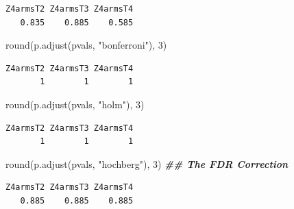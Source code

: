 \documentclass[
  12pt,
]{book}
\newenvironment{Shaded}{\begin{snugshade}}{\end{snugshade}}
\newcommand{\CommentTok}[1]{\textcolor[rgb]{0.56,0.35,0.01}{\textit{#1}}}
\newcommand{\DecValTok}[1]{\textcolor[rgb]{0.00,0.00,0.81}{#1}}
\newcommand{\DocumentationTok}[1]{\textcolor[rgb]{0.56,0.35,0.01}{\textbf{\textit{#1}}}}
\newcommand{\FunctionTok}[1]{\textcolor[rgb]{0.00,0.00,0.00}{#1}}
\newcommand{\NormalTok}[1]{#1}
\newcommand{\OtherTok}[1]{\textcolor[rgb]{0.56,0.35,0.01}{#1}}
\newcommand{\SpecialCharTok}[1]{\textcolor[rgb]{0.00,0.00,0.00}{#1}}
\newcommand{\StringTok}[1]{\textcolor[rgb]{0.31,0.60,0.02}{#1}}
\theoremstyle{definition}
\theoremstyle{definition}
\theoremstyle{definition}
\theoremstyle{remark}
\begin{document}
\begin{Shaded}
\end{Shaded}

\begin{verbatim}
Z4armsT2 Z4armsT3 Z4armsT4 
   0.835    0.885    0.585 
\end{verbatim}

\begin{Shaded}
\begin{Highlighting}[]
\FunctionTok{round}\NormalTok{(}\FunctionTok{p.adjust}\NormalTok{(pvals, }\StringTok{"bonferroni"}\NormalTok{), }\DecValTok{3}\NormalTok{)}
\end{Highlighting}
\end{Shaded}

\begin{verbatim}
Z4armsT2 Z4armsT3 Z4armsT4 
       1        1        1 
\end{verbatim}

\begin{Shaded}
\begin{Highlighting}[]
\FunctionTok{round}\NormalTok{(}\FunctionTok{p.adjust}\NormalTok{(pvals, }\StringTok{"holm"}\NormalTok{), }\DecValTok{3}\NormalTok{)}
\end{Highlighting}
\end{Shaded}

\begin{verbatim}
Z4armsT2 Z4armsT3 Z4armsT4 
       1        1        1 
\end{verbatim}

\begin{Shaded}
\begin{Highlighting}[]
\FunctionTok{round}\NormalTok{(}\FunctionTok{p.adjust}\NormalTok{(pvals, }\StringTok{"hochberg"}\NormalTok{), }\DecValTok{3}\NormalTok{) }\DocumentationTok{\#\# The  FDR Correction}
\end{Highlighting}
\end{Shaded}

\begin{verbatim}
Z4armsT2 Z4armsT3 Z4armsT4 
   0.885    0.885    0.885 
\end{verbatim}
\end{document}
